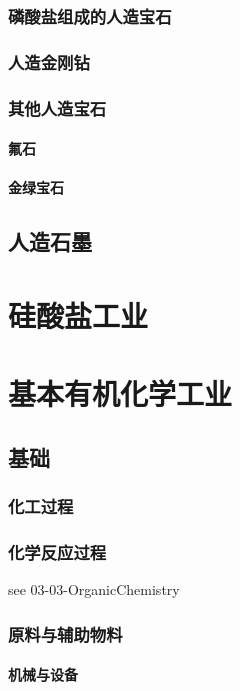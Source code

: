 \documentclass[UTF8]{../../ApplicationUniverse}
\begin{document}
    \subsection{磷酸盐组成的人造宝石}
    \subsection{人造金刚钻}
    \subsection{其他人造宝石}
        \subsubsection{氟石}
        \subsubsection{金绿宝石}
\section{人造石墨}







\chapter{硅酸盐工业} %



\chapter{基本有机化学工业}
\section{基础}
    \subsection{化工过程}
    \subsection{化学反应过程} %
    see 03-03-OrganicChemistry
    \subsection{原料与辅助物料}
    \subsubsection{机械与设备}
\end{document}
